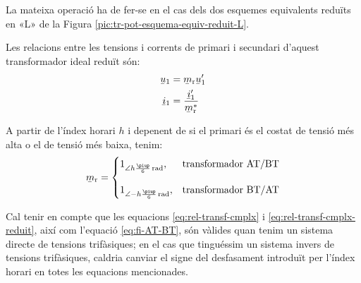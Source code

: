 La mateixa operació ha de fer-se en el cas dels dos esquemes equivalents reduïts en «L» de la Figura \vref{pic:tr-pot-esquema-equiv-reduit-L}.

Les relacions entre les tensions i corrents de primari i secundari d'aquest transformador ideal reduït són:
\begin{subequations}
\begin{align}
    \cmplx{u}_1 &= \cmplx{m}\ped{r}\cmplx{u}'_1\\  \cmplx{i}_1 &= \frac{\cmplx{i}'_1}{\cmplx{m}^*\ped{r}}
\end{align}
\end{subequations}

A partir de l'índex horari $h$ i depenent de si el primari és el costat de tensió més alta o el de tensió més baixa, tenim:
\begin{equation}
\cmplx{m}\ped{r} = \begin{cases}
      1_{\angle h\frac{\piup}{6}\si{\,rad}}, & \text{transformador AT/BT}\\[2.7ex]
      1_{\angle -h\frac{\piup}{6}\si{\,rad}}, & \text{transformador BT/AT}
\end{cases}
\label{eq:rel-transf-cmplx-reduit}
\end{equation}

Cal tenir en compte que les equacions \eqref{eq:rel-transf-cmplx} i \eqref{eq:rel-transf-cmplx-reduit}, així com l'equació \eqref{eq:fi-AT-BT}, són vàlides quan tenim un sistema directe de tensions trifàsiques; en el cas que tinguéssim un sistema invers de tensions trifàsiques, caldria canviar el signe del desfasament introduït per l'índex horari en totes les equacions mencionades.


